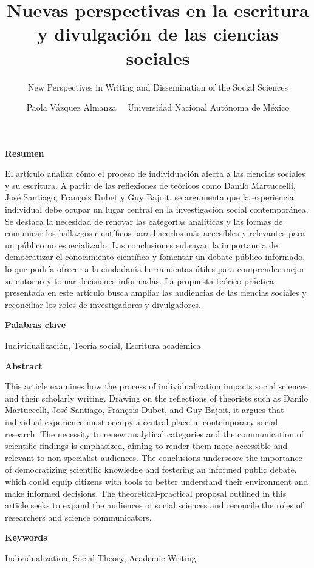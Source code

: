 \documentclass[
]{interact}
\title{Nuevas perspectivas en la escritura y divulgación de las ciencias
sociales}
\subtitle{New Perspectives in Writing and Dissemination of the Social
Sciences}
\author{Paola Vázquez Almanza \textbar\ \textbar\ 
Universidad Nacional Autónoma de México}
\begin{document}
\captionsetup{labelsep=space}
\maketitle


\newcommand{\articuloTitulo}{Nuevas perspectivas en la escritura}

\begin{footnotesize}
\textbf{Resumen}

El artículo analiza cómo el proceso de individuación afecta a las ciencias sociales y su escritura. A partir de las reflexiones de teóricos como Danilo Martuccelli, José Santiago, François Dubet y Guy Bajoit, se argumenta que la experiencia individual debe ocupar un lugar central en la investigación social contemporánea. Se destaca la necesidad de renovar las categorías analíticas y las formas de comunicar los hallazgos científicos para hacerlos más accesibles y relevantes para un público no especializado. Las conclusiones subrayan la importancia de democratizar el conocimiento científico y fomentar un debate público informado, lo que podría ofrecer a la ciudadanía herramientas útiles para comprender mejor su entorno y tomar decisiones informadas. La propuesta teórico-práctica presentada en este artículo busca ampliar las audiencias de las ciencias sociales y reconciliar los roles de investigadores y divulgadores.

\textbf{Palabras clave}

Individualización, Teoría social, Escritura académica
\end{footnotesize}

\newpage

\begin{footnotesize}
\textbf{Abstract}

This article examines how the process of individualization impacts social sciences and their scholarly writing. Drawing on the reflections of theorists such as Danilo Martuccelli, José Santiago, François Dubet, and Guy Bajoit, it argues that individual experience must occupy a central place in contemporary social research. The necessity to renew analytical categories and the communication of scientific findings is emphasized, aiming to render them more accessible and relevant to non-specialist audiences. The conclusions underscore the importance of democratizing scientific knowledge and fostering an informed public debate, which could equip citizens with tools to better understand their environment and make informed decisions. The theoretical-practical proposal outlined in this article seeks to expand the audiences of social sciences and reconcile the roles of researchers and science communicators.

\textbf{Keywords}

Individualization, Social Theory, Academic Writing
\end{footnotesize}
\end{document}
